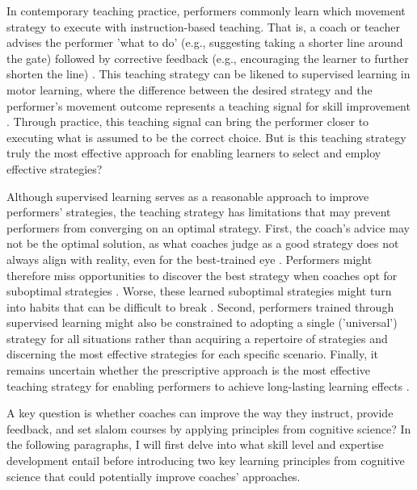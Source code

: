 In contemporary teaching practice, performers commonly learn which movement strategy to execute with instruction-based teaching. That is, a coach or teacher advises the performer 'what to do' (e.g., suggesting taking a shorter line around the gate) followed by corrective feedback (e.g., encouraging the learner to further shorten the line) \cite{williams_practice_2005, williams_effective_2023, hodges_modelling_2002}. This teaching strategy can be likened to supervised learning in motor learning, where the difference between the desired strategy and the performer's movement outcome represents a teaching signal for skill improvement  \cite{jordan_forward_1992, wolpert_motor_2010, doya_complementary_2000}. Through practice, this teaching signal can bring the performer closer to executing what is assumed to be the correct choice. But is this teaching strategy truly the most effective approach for enabling learners to select and employ effective strategies? 

Although supervised learning serves as a reasonable approach to improve performers' strategies, the teaching strategy has limitations that may prevent performers from converging on an optimal strategy. First, the coach's advice may not be the optimal solution, as what coaches judge as a good strategy does not always align with reality, even for the best-trained eye \cite{supej_impact_2019, cochrum_visual_2021}. Performers might therefore miss opportunities to discover the best strategy when coaches opt for suboptimal strategies \cite{gray_plateaus_2017}. Worse, these learned suboptimal strategies might turn into habits that can be difficult to break \cite{popp_effect_2020}. Second, performers trained through supervised learning might also be constrained to adopting a single ('universal') strategy for all situations rather than acquiring a repertoire of strategies and discerning the most effective strategies for each specific scenario. Finally, it remains uncertain whether the prescriptive approach is the most effective teaching strategy for enabling performers to achieve long-lasting learning effects \cite{wulf_instructions_1997, hodges_role_1999, williams_practice_2005,williams_effective_2023}. 


A key question is whether coaches can improve the way they instruct, provide feedback, and set slalom courses by applying principles from cognitive science? In the following paragraphs, I will first delve into what skill level and expertise development entail before introducing two key learning principles from cognitive science that could potentially improve coaches' approaches. 





